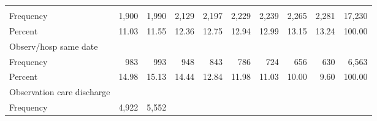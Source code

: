 \documentclass{article}
\begin{document}
\begin{table}[!h]
\begin{tabular}{llllllllll}
  \multicolumn{1}{r}{} &
  \multicolumn{1}{r}{} &
  \multicolumn{1}{r}{} &
  \multicolumn{1}{r}{} &
  \multicolumn{1}{r}{} \\
\multicolumn{1}{l}{\hspace{2em}Frequency} &
  \multicolumn{1}{|r}{1,900} &
  \multicolumn{1}{r}{1,990} &
  \multicolumn{1}{r}{2,129} &
  \multicolumn{1}{r}{2,197} &
  \multicolumn{1}{r}{2,229} &
  \multicolumn{1}{r}{2,239} &
  \multicolumn{1}{r}{2,265} &
  \multicolumn{1}{r}{2,281} &
  \multicolumn{1}{r}{17,230} \\
\multicolumn{1}{l}{\hspace{2em}Percent} &
  \multicolumn{1}{|r}{11.03} &
  \multicolumn{1}{r}{11.55} &
  \multicolumn{1}{r}{12.36} &
  \multicolumn{1}{r}{12.75} &
  \multicolumn{1}{r}{12.94} &
  \multicolumn{1}{r}{12.99} &
  \multicolumn{1}{r}{13.15} &
  \multicolumn{1}{r}{13.24} &
  \multicolumn{1}{r}{100.00} \\
\multicolumn{1}{l}{\hspace{1em}Observ/hosp same date} &
  \multicolumn{1}{|r}{} &
  \multicolumn{1}{r}{} &
  \multicolumn{1}{r}{} &
  \multicolumn{1}{r}{} &
  \multicolumn{1}{r}{} &
  \multicolumn{1}{r}{} &
  \multicolumn{1}{r}{} &
  \multicolumn{1}{r}{} &
  \multicolumn{1}{r}{} \\
\multicolumn{1}{l}{\hspace{2em}Frequency} &
  \multicolumn{1}{|r}{983} &
  \multicolumn{1}{r}{993} &
  \multicolumn{1}{r}{948} &
  \multicolumn{1}{r}{843} &
  \multicolumn{1}{r}{786} &
  \multicolumn{1}{r}{724} &
  \multicolumn{1}{r}{656} &
  \multicolumn{1}{r}{630} &
  \multicolumn{1}{r}{6,563} \\
\multicolumn{1}{l}{\hspace{2em}Percent} &
  \multicolumn{1}{|r}{14.98} &
  \multicolumn{1}{r}{15.13} &
  \multicolumn{1}{r}{14.44} &
  \multicolumn{1}{r}{12.84} &
  \multicolumn{1}{r}{11.98} &
  \multicolumn{1}{r}{11.03} &
  \multicolumn{1}{r}{10.00} &
  \multicolumn{1}{r}{9.60} &
  \multicolumn{1}{r}{100.00} \\
\multicolumn{1}{l}{\hspace{1em}Observation care discharge} &
  \multicolumn{1}{|r}{} &
  \multicolumn{1}{r}{} &
  \multicolumn{1}{r}{} &
  \multicolumn{1}{r}{} &
  \multicolumn{1}{r}{} &
  \multicolumn{1}{r}{} &
  \multicolumn{1}{r}{} &
  \multicolumn{1}{r}{} &
  \multicolumn{1}{r}{} \\
\multicolumn{1}{l}{\hspace{2em}Frequency} &
  \multicolumn{1}{|r}{4,922} &
  \multicolumn{1}{r}{5,552} &

\end{tabular}
\end{table}
\end{document}
